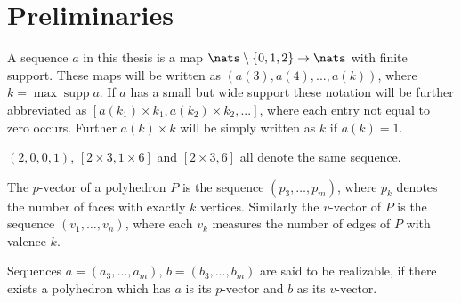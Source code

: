 \section{Preliminaries}

\begin{definition}[Sequence]
  A sequence $a$ in this thesis is a map $\nats \setminus \{0, 1, 2\} \rightarrow \nats$ with finite support. These maps will be written as $(a(3), a(4), ..., a(k))$, where $k = \operatorname{max} \operatorname{supp} a$. If $a$ has a small but wide support these notation will be further abbreviated as $[a(k_1) \times k_1, a(k_2) \times k_2, ...]$, where each entry not equal to zero occurs. Further $a(k) \times k$ will be simply written as $k$ if $a(k) = 1$.
\end{definition}
\begin{example}
  $(2, 0, 0, 1)$, $[2 \times 3, 1 \times 6]$ and $[2 \times 3, 6]$ all denote the same sequence. 
\end{example}
\begin{definition}\label{def:relizable}
  The $p$-vector of a polyhedron $P$ is the sequence $(p_3, \dots, p_m)$, where $p_k$ denotes the number of faces with exactly $k$ vertices. Similarly the $v$-vector of $P$ is the sequence $(v_1, \dots, v_n)$, where each $v_k$ measures the number of edges of $P$ with valence $k$. 
\end{definition}

\begin{definition}\label{def:realizable}
  Sequences $a = (a_3, \dots, a_m)$, $b = (b_3, \dots, b_m)$ are said to be realizable, if there exists a polyhedron which has $a$ is its $p$-vector and $b$ as its $v$-vector.
\end{definition}


